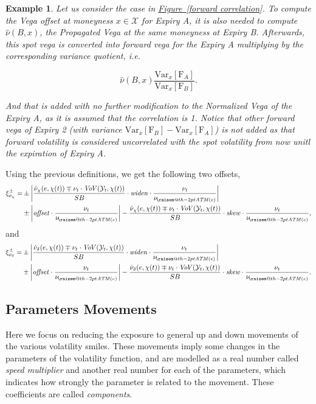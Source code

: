 \documentclass[10pt, a4paper, oneside]{article}
\makeatletter
\newtheorem*{example}{Example}
\newcommand{\Var}{\ensuremath{\mathrm{Var}}}
\newcommand{\raisemath}[1]{\mathpalette{\raisem@th{#1}}}
\newcommand{\raisem@th}[3]{\raisebox{#1}{$#2#3$}}
\newcommand{\atm}{\ensuremath{\mathit{ATM}}}
\newcommand{\future}{\ensuremath{\mathrm{F}}}
\newcommand{\moneynessset}{\ensuremath{\mathcal{X}}}
\newcommand{\vega}{\ensuremath{\nu}}
\newcommand{\atmvega}{\ensuremath{{\vega_{\!\raisemath{-2pt}{\atm(e)}}}}}
\newcommand{\yte}{\ensuremath{\mathcal{Y}}}
\newcommand{\pvega}{\ensuremath{\hat{\vega}}}
\newcommand{\nvega}{\ensuremath{\dot{\vega}}}
\newcommand{\nvegam}{\ensuremath{{\nvega_\moneyness}}}
\newcommand{\nvegad}{\ensuremath{{\nvega_\delta}}}
\newcommand{\offsetbs}{\ensuremath{\xi^{\pm}}}
\newcommand{\moneyness}{\ensuremath{\chi}}
\newcommand{\VoV}{\ensuremath{\mathit{Vo\!V}}}
\newcommand{\widen}{\ensuremath{\mathit{widen}}}
\newcommand{\skw}{\ensuremath{\mathit{skew}}}
\newcommand{\offset}{\ensuremath{\mathit{offset}}}
\makeatother
\begin{document}
\begin{framed}\begin{example}

Let us consider the case in \hyperref[forward correlation]{Figure~\ref*{forward correlation}}. To compute the Vega offset at moneyness $x\in\moneynessset$ for \emph{Expiry A}, it is also needed to compute $\pvega(B, x)$, the \emph{Propagated Vega} at the same moneyness
at \emph{Expiry B}. Afterwards, this spot vega is converted into forward vega for the \emph{Expiry A} multiplying by the corresponding variance quotient, i.e.

\[ \pvega(B, x) \frac{\Var_x[\future_A]}{\Var_x[\future_B]}. \]

And that is added with no further modification to the \emph{Normalized Vega} of the \emph{Expiry A}, as it is assumed that the correlation is 1. Notice that other forward vega of Expiry 2 (with variance $\Var_x[\future_B] - \Var_x[\future_A]$) is not added
as that forward volatility is considered uncorrelated with the spot volatility from now unitl the expiration of \emph{Expiry A}.

\end{example}\end{framed}

 


\noindent Using the previous definitions, we get the following two offsets,
\newcommand{\propvegaskewunits}[3]{\ensuremath{\frac{{#1}\mp{#2}}{{#3}}}}
\newcommand{\vegaoffsetformula}[5]{\offsetbs_{#5}=&\pm\left|\propvegaskewunits{#1}{#4}{#3}\cdot\widen\cdot{#2}\right| \\&\pm \left|\offset\cdot{#2}\right| - \propvegaskewunits{#1}{#4}{#3}\cdot\skw\cdot{#2}}
\begin{align*}\vegaoffsetformula{\nvegam(e, \moneyness(t))}{\frac{\vega_t}{\atmvega}}{SB}{\vega_t\cdot\VoV(\yte_t, \moneyness(t))}{\nvegam},\end{align*}
and
\begin{align*}\vegaoffsetformula{\nvegad(e, \moneyness(t))}{\frac{\vega_t}{\atmvega}}{SB}{\vega_t\cdot\VoV(\yte_t, \moneyness(t))}{\nvegad}.\end{align*}




\subsection{Parameters Movements}

\noindent Here we focus on reducing the exposure to general up and down movements of the various volatility smiles. These movements imply some changes in the parameters of the volatility function, and are modelled as
a real number called \emph{speed multiplier} and another real number for each of the parameters, which indicates how strongly the parameter is related to the movement. These coefficients are called \emph{components}.
\end{document}
